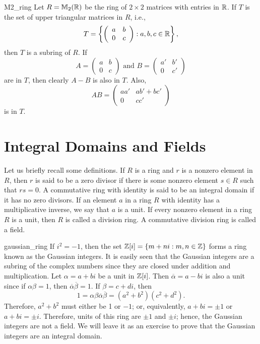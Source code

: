  
\begin{example}{M2_ring}
Let  $R ={\Bbb M}_2( {\Bbb R} )$ be the ring of $2 \times 2$ matrices
with entries in ${\Bbb R}$. If $T$ is the set of upper triangular
matrices in $R$, i.e.,
\[
T =
\left\{
\left(
\begin{array}{cc}
a & b \\
0 & c
\end{array}
\right)
: a, b, c \in {\Bbb R}
\right\},
\]
then $T$ is a subring of $R$. If
\[
A=
\left(
\begin{array}{cc}
a & b \\
0 & c
\end{array}
\right)
\mbox{ and }
B =
\left(
\begin{array}{cc}
a' & b' \\
0 & c'
\end{array}
\right)
\]
are in $T$, then clearly $A-B$ is also in $T$. Also,
\[
AB =
\left(
\begin{array}{cc}
a a' & ab' + bc' \\
0 & cc'
\end{array}
\right)
\]
is in $T$.
\end{example}
 
 
 
\section{Integral Domains and Fields}
 
 
Let us briefly recall some definitions. If $R$ is a ring and $r$ is a
nonzero element in $R$, then $r$ is said to  be a {\bfi zero divisor\/}
if there is some nonzero element $s \in R$ such that $rs = 0$. A
commutative ring with identity is said to be an {\bfi integral
domain\/} if it has no zero divisors.  If an element $a$ in a ring $R$
with identity has a multiplicative inverse, we say that $a$ is a {\bfi
unit}. If every nonzero element in a ring $R$ is a unit, then $R$ is
called a {\bfi division ring}.  A commutative division ring is called
a {\bfi field}. 
 
 
\begin{example}{gaussian_ring}
If $i^2 = -1$, then the set ${\Bbb Z}[ i ] = \{ m + ni : m, n \in
{\Bbb Z} \}$ forms a ring known as the {\bfi Gaussian
integers}\label{gaussianintegers}. It is
easily seen that the Gaussian integers are a subring of the complex
numbers since they are closed under addition and multiplication. Let
$\alpha = a + bi$ be a unit in ${\Bbb Z}[ i ]$. Then
$\overline{\alpha} = a - bi$ is also a unit since if $\alpha \beta =
1$, then $\overline{\alpha} \overline{\beta} = 1$. If $\beta = c +
di$, then   
\[
1 = \alpha \beta \overline{\alpha} \overline{\beta} = (a^2 +
b^2 )(c^2
+ d^2).
\]
Therefore, $a^2 + b^2$ must either be 1 or $-1$; or, equivalently, $a
+ bi = \pm 1$ or $a+ bi = \pm i$.  Therefore, units of this ring are
$\pm 1$ and $\pm i$; hence, the Gaussian integers are not a field. We
will leave it as an exercise to prove that the Gaussian integers are
an integral domain. 
\end{example}
 
